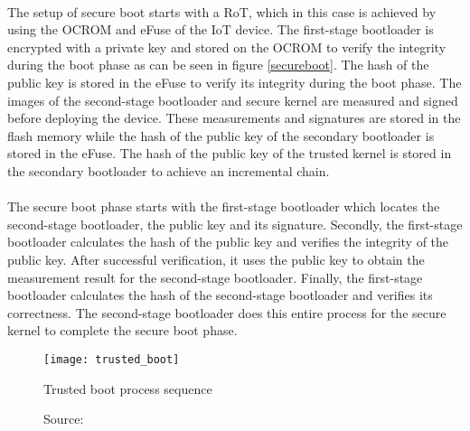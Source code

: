 \paragraph*{}
The setup of secure boot starts with a RoT, which in this case is achieved by using the OCROM and eFuse of the IoT device. The first-stage bootloader is encrypted with a private key and stored on the OCROM to verify the integrity during the boot phase as can be seen in figure \ref{secureboot}. The hash of the public key is stored in the eFuse to verify its integrity during the boot phase. The images of the second-stage bootloader and secure kernel are measured and signed before deploying the device. These measurements and signatures are stored in the flash memory while the hash of the public key of the secondary bootloader is stored in the eFuse. The hash of the public key of the trusted kernel is stored in the secondary bootloader to achieve an incremental chain.

\paragraph*{}
The secure boot phase starts with the first-stage bootloader which locates the second-stage bootloader, the public key and its signature. Secondly, the first-stage bootloader calculates the hash of the public key and verifies the integrity of the public key. After successful verification, it uses the public key to obtain the measurement result for the second-stage bootloader. Finally, the first-stage bootloader calculates the hash of the second-stage bootloader and verifies its correctness. The second-stage bootloader does this entire process for the secure kernel to complete the secure boot phase.

\begin{figure}[h]
\centering
\texttt{[image: trusted\_boot]}
\caption{Trusted boot process sequence}
\caption*{Source: \cite{LingZhen2021Sbtb}}
\label{trustedboot}
\end{figure}

